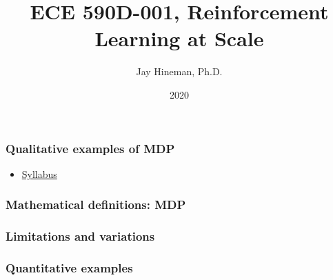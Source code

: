 \documentclass{beamer}
\title{ECE 590D-001, Reinforcement Learning at Scale}
\author{Jay Hineman, Ph.D.}
\institute{Geometric Data Analytics}
\date{2020}
\begin{document}
 
\frame{\titlepage}
 
\begin{frame}
  \frametitle{Qualitative examples of MDP}
  \begin{itemize}
    \item \href{https://github.com/jhineman/spring2019ece590hineman}{Syllabus}
  \end{itemize}
\end{frame}

\begin{frame}
  \frametitle{Mathematical definitions: MDP}
\end{frame}

\begin{frame}
  \frametitle{Limitations and variations}
\end{frame}

\begin{frame}
  \frametitle{Quantitative examples}
\end{frame}
\end{document}

